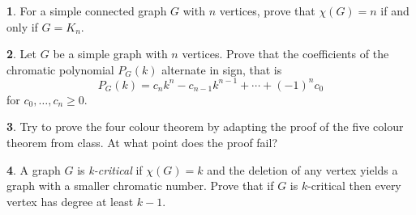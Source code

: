 \documentclass[12pt]{article}
\theoremstyle{definition}
\newtheorem{problem}{}
\begin{document}
\begin{problem} 
For a simple connected graph $G$ with $n$ vertices, prove that  $\chi (G) = n$ if and only if $G=K_n$.
\end{problem}

\begin{problem}
Let $G$ be a simple graph with $n$ vertices. Prove that the coefficients of the chromatic polynomial $P_G(k)$ alternate in sign, that is
$$P_G(k) = c_nk^n-c_{n-1}k^{n-1}+\cdots +(-1)^nc_0$$ for $c_0, \ldots , c_{n} \geq 0$.
\end{problem}


\begin{problem}
Try to prove the four colour theorem by adapting the proof of the five colour theorem from class. At what point does the proof fail?
\end{problem}



\begin{problem}
A graph $G$ is \emph{k-critical} if $\chi(G)=k$ and the deletion of any vertex yields a graph with a smaller chromatic number. Prove that if $G$ is $k$-critical then every vertex has degree at least $k-1$.\end{problem}
\end{document}

